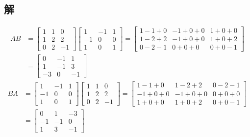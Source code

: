 \subsection{解}
\begin{align}
	AB
&=
	\left[
	\begin{array}{ccc}
		 1 &  1 &  0 \\
		 1 &  2 &  2 \\
		 0 &  2 & -1
	\end{array}
	\right]
		\left[
		\begin{array}{ccc}
			 1 & -1 &  1 \\
			-1 &  0 &  0 \\
			 1 &  0 &  1
		\end{array}
		\right]
%
%
=
	\left[
	\begin{array}{ccc}
		1-1+0 & -1+0+0 & 1+0+0 \\
		1-2+2 & -1+0+0 & 1+0+2 \\
		0-2-1 & 0+0+0 & 0+0-1
	\end{array}
	\right] \\
%
%
&=
	\left[
	\begin{array}{ccc}
		0 & -1 & 1 \\
		1 & -1 & 3 \\
		-3 & 0 & -1
	\end{array}
	\right]
\end{align}
\begin{align}
	BA
&=
	\left[
	\begin{array}{ccc}
		 1 & -1 &  1 \\
		-1 &  0 &  0 \\
		 1 &  0 &  1
	\end{array}
	\right]
		\left[
		\begin{array}{ccc}
			 1 &  1 &  0 \\
			 1 &  2 &  2 \\
			 0 &  2 & -1
		\end{array}
		\right]
%
%
=
	\left[
	\begin{array}{ccc}
		1-1+0 & 1-2+2 & 0-2-1 \\
		-1+0+0 & -1+0+0 & 0+0+0 \\
		1+0+0 & 1+0+2 & 0+0-1
	\end{array}
	\right] \\
%
%
&=
	\left[
	\begin{array}{ccc}
		0 & 1 & -3 \\
		-1 & -1 & 0 \\
		1 & 3 & -1
	\end{array}
	\right]
\end{align}

